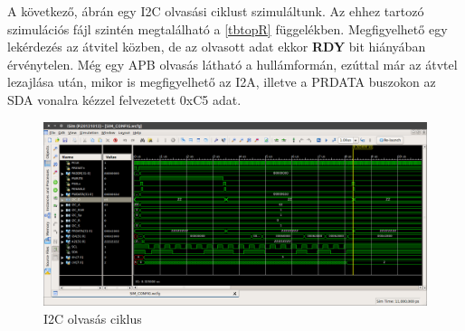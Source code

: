 A következő,  ábrán egy I2C olvasási ciklust szimuláltunk. Az ehhez tartozó szimulációs fájl szintén megtalálható a \ref{tbtopR} függelékben.
Megfigyelhető egy lekérdezés az átvitel közben, de az olvasott adat ekkor \textbf{RDY} bit hiányában érvénytelen. Még egy APB olvasás látható a hullámformán, ezúttal már az átvtel lezajlása után, mikor is megfigyelhető az I2A, illetve a PRDATA buszokon az SDA vonalra kézzel felvezetett 0xC5 adat.
\begin{figure}[ht!]
    \includegraphics[width=\textwidth]{figures/I2C_R4.png}
    \caption{I2C olvasás ciklus}
    \label{fig:I2Cread}
\end{figure}
